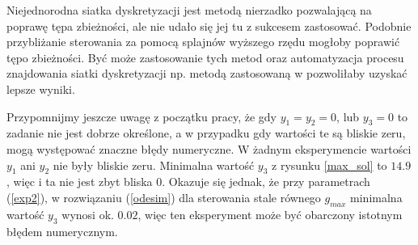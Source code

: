 \documentclass[11pt]{article}
\begin{document}
Niejednorodna siatka dyskretyzacji jest metodą nierzadko pozwalającą na poprawę tępa zbieżności, ale nie udało się jej tu z sukcesem zastosować. Podobnie przybliżanie sterowania za pomocą splajnów wyższego rzędu mogłoby poprawić tępo zbieżności. Być może zastosowanie tych metod oraz automatyzacja procesu znajdowania siatki dyskretyzacji np. metodą zastosowaną w \cite{Rao-ph} pozwoliłaby uzyskać lepsze wyniki.

Przypomnijmy jeszcze uwagę z początku pracy, że gdy $y_1 = y_2 = 0$, lub $y_3 = 0$ to zadanie nie jest dobrze określone, a w przypadku gdy wartości te są bliskie zeru, mogą występować znaczne błędy numeryczne. W żadnym eksperymencie wartości $y_1$ ani $y_2$ nie były bliskie zeru. Minimalna wartość $y_3$ z rysunku \ref{max_sol} to $14.9$, więc i ta nie jest zbyt bliska 0. Okazuje się jednak, że przy parametrach (\ref{exp2}), w rozwiązaniu (\ref{odesim}) dla sterowania stale równego $g_{max}$ minimalna wartość $y_3$ wynosi ok. $0.02$, więc ten eksperyment może być obarczony istotnym błędem numerycznym.
\end{document}
